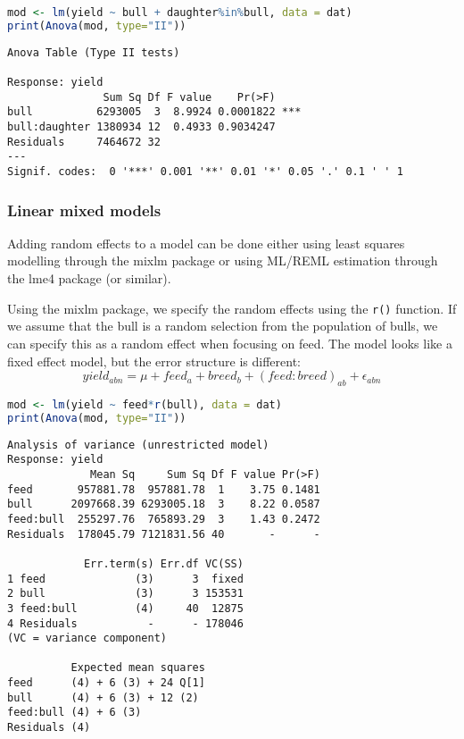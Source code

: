 \begin{lstlisting}[language=R, columns=fullflexible, basicstyle=\linespread{0.85}\small\ttfamily, stringstyle=\color{DarkGreen}, keywordstyle=\color{blue}, commentstyle=\color{DarkGreen},]
mod <- lm(yield ~ bull + daughter%in%bull, data = dat)
print(Anova(mod, type="II"))
\end{lstlisting}
\begin{Verbatim}[fontsize=\small]
Anova Table (Type II tests)

Response: yield
               Sum Sq Df F value    Pr(>F)
bull          6293005  3  8.9924 0.0001822 ***
bull:daughter 1380934 12  0.4933 0.9034247
Residuals     7464672 32
---
Signif. codes:  0 '***' 0.001 '**' 0.01 '*' 0.05 '.' 0.1 ' ' 1
\end{Verbatim}

\subsubsection{Linear mixed models}\label{linear-mixed-models}

Adding random effects to a model can be done either using least squares
modelling through the mixlm package or using ML/REML estimation through
the lme4 package (or similar).

\label{classical---mixlm}

Using the mixlm package, we specify the random effects using the
\texttt{r()} function. If we assume that the bull is a random selection
from the population of bulls, we can specify this as a random effect
when focusing on feed. The model looks like a fixed effect model, but
the error structure is different:
\[yield_{abn} = \mu + feed_a + breed_b + (feed:breed)_{ab} + \epsilon_{abn}\]

\begin{lstlisting}[language=R, columns=fullflexible, basicstyle=\linespread{0.85}\small\ttfamily, stringstyle=\color{DarkGreen}, keywordstyle=\color{blue}, commentstyle=\color{DarkGreen},]
mod <- lm(yield ~ feed*r(bull), data = dat)
print(Anova(mod, type="II"))
\end{lstlisting}
\begin{Verbatim}[fontsize=\small]
Analysis of variance (unrestricted model)
Response: yield
             Mean Sq     Sum Sq Df F value Pr(>F)
feed       957881.78  957881.78  1    3.75 0.1481
bull      2097668.39 6293005.18  3    8.22 0.0587
feed:bull  255297.76  765893.29  3    1.43 0.2472
Residuals  178045.79 7121831.56 40       -      -

            Err.term(s) Err.df VC(SS)
1 feed              (3)      3  fixed
2 bull              (3)      3 153531
3 feed:bull         (4)     40  12875
4 Residuals           -      - 178046
(VC = variance component)

          Expected mean squares
feed      (4) + 6 (3) + 24 Q[1]
bull      (4) + 6 (3) + 12 (2)
feed:bull (4) + 6 (3)
Residuals (4)
\end{Verbatim}

